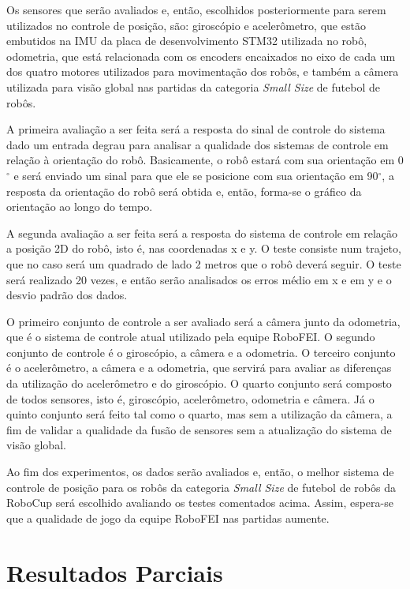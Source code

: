\documentclass[acronym, symbols]{fei}
\begin{document}
		Os sensores que serão avaliados e, então, escolhidos posteriormente para serem utilizados no controle de posição, são: giroscópio e acelerômetro, que estão embutidos na IMU da placa de desenvolvimento STM32 utilizada no robô, odometria, que está relacionada com os encoders encaixados no eixo de cada um dos quatro motores utilizados para movimentação dos robôs, e também a câmera utilizada para visão global nas partidas da categoria \textit{Small Size} de futebol de robôs.
		
		A primeira avaliação a ser feita será a resposta do sinal de controle do sistema dado um entrada degrau para analisar a qualidade dos sistemas de controle em relação à orientação do robô. Basicamente, o robô estará com sua orientação em 0$^\circ$ e será enviado um sinal para que ele se posicione com sua orientação em 90$^\circ$, a resposta da orientação do robô será obtida e, então, forma-se o gráfico da orientação ao longo do tempo.
		
		A segunda avaliação a ser feita será a resposta do sistema de controle em relação a posição 2D do robô, isto é, nas coordenadas x e y. O teste consiste num trajeto, que no caso será um quadrado de lado 2 metros que o robô deverá seguir. O teste será realizado 20 vezes, e então serão analisados os erros médio em x e em y e o desvio padrão dos dados.
		
		O primeiro conjunto de controle a ser avaliado será a câmera junto da odometria, que é o sistema de controle atual utilizado pela equipe RoboFEI. O segundo conjunto de controle é o giroscópio, a câmera e a odometria. O terceiro conjunto é o acelerômetro, a câmera e a odometria, que servirá para avaliar as diferenças da utilização do acelerômetro e do giroscópio. O quarto conjunto será composto de todos sensores, isto é, giroscópio, acelerômetro, odometria e câmera. Já o quinto conjunto será feito tal como o quarto, mas sem a utilização da câmera, a fim de validar a qualidade da fusão de sensores sem a atualização do sistema de visão global.
		
		Ao fim dos experimentos, os dados serão avaliados e, então, o melhor sistema de controle de posição para os robôs da categoria \textit{Small Size} de futebol de robôs da RoboCup será escolhido avaliando os testes comentados acima. Assim, espera-se que a qualidade de jogo da equipe RoboFEI nas partidas aumente.
	
\chapter{Resultados Parciais}
	
	\printbibliography
\end{document}
